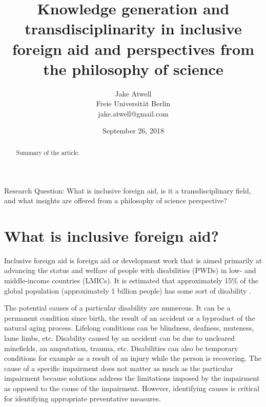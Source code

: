 \documentclass[a4paper]{article}
\begin{document}
\title{Knowledge generation and transdisciplinarity in inclusive foreign aid
and perspectives from the philosophy of science}
\author{Jake Atwell\\
    Freie Universität Berlin\\
    jake.atwell@gmail.com
}
\date{September 26, 2018}

\maketitle



\begin{abstract}
Summary of the article.
\end{abstract}
\newpage

\noindent Research Question: What is inclusive foreign aid, is it a
transdisciplinary field, and what insights are offered from a philosophy of
science perspective?

\tableofcontents

\newpage
{} %




\section{What is inclusive foreign aid?}

Inclusive foreign aid is foreign aid or development work that is aimed
primarily at advancing the status and welfare of people with disabilities
(PWDs) in low- and middle-income countries (LMICs). It is estimated that
approximately 15\% of the global population (approximately 1 billion people)
has some sort of disability \citep{banks2017poverty}.

The potential causes of a particular disability are numerous. It can be a
permanent condition since birth, the result of an accident or a byproduct of
the natural aging process. Lifelong conditions can be blindness, deafness,
muteness, lame limbs, etc. Disability caused by an accident can be due to
uncleared minefields, an amputation, trauma, etc. Disabilities can also be
temporary conditions for example as a result of an injury while the person is
recovering. The cause of a specific impairment does not matter as much as the
particular impairment because solutions address the limitations imposed by the
impairment as opposed to the cause of the impairment. However, identifying
causes is critical for identifying appropriate preventative measures.
\end{document}
